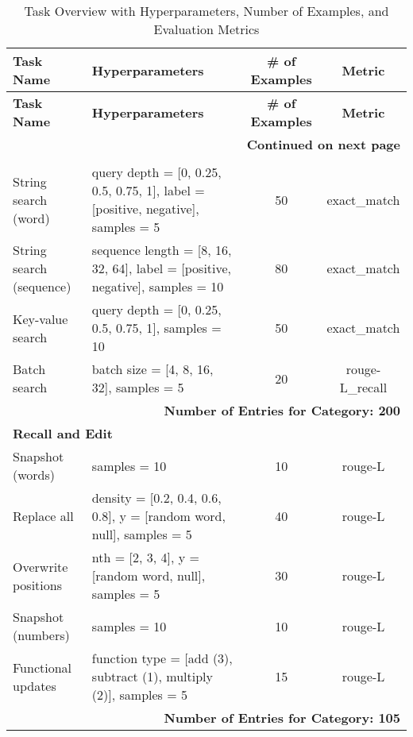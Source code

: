 \begin{longtable}{lp{6.5cm}cc}
\caption{Task Overview with Hyperparameters, Number of Examples, and Evaluation Metrics\label{tab:task_details}} \\

\toprule
\textbf{Task Name} & \textbf{Hyperparameters} & \textbf{\# of Examples} & \textbf{Metric} \\ 
\midrule
\endfirsthead

\toprule
\textbf{Task Name} & \textbf{Hyperparameters} & \textbf{\# of Examples} & \textbf{Metric} \\ 
\midrule
\endhead

\midrule
\multicolumn{4}{r}{\textbf{Continued on next page}} \\ 
\midrule
\endfoot

\bottomrule
\endlastfoot

\multicolumn{4}{l}{\textbf{Search}} \\ 
String search (word) & query depth = [0, 0.25, 0.5, 0.75, 1], label = [positive, negative], samples = 5 & 50 & exact\_match \\
String search (sequence) & sequence length = [8, 16, 32, 64], label = [positive, negative], samples = 10 & 80 & exact\_match \\ 
Key-value search & query depth = [0, 0.25, 0.5, 0.75, 1], samples = 10 & 50 & exact\_match \\ 
Batch search & batch size = [4, 8, 16, 32], samples = 5 & 20 & rouge-L\_recall \\
\midrule
\multicolumn{4}{r}{\textbf{Number of Entries for Category: 200}} \\ 
\midrule

\multicolumn{4}{l}{\textbf{Recall and Edit}} \\ 
Snapshot (words) & samples = 10 & 10 & rouge-L \\
Replace all & density = [0.2, 0.4, 0.6, 0.8], y = [random word, null], samples = 5 & 40 & rouge-L \\
Overwrite positions & nth = [2, 3, 4], y = [random word, null], samples = 5 & 30 & rouge-L \\ 
Snapshot (numbers) & samples = 10 & 10 & rouge-L \\ 
Functional updates & function type = [add (3), subtract (1), multiply (2)], samples = 5 & 15 & rouge-L \\ 
\midrule
\multicolumn{4}{r}{\textbf{Number of Entries for Category: 105}} \\ 
\midrule


\end{longtable}
